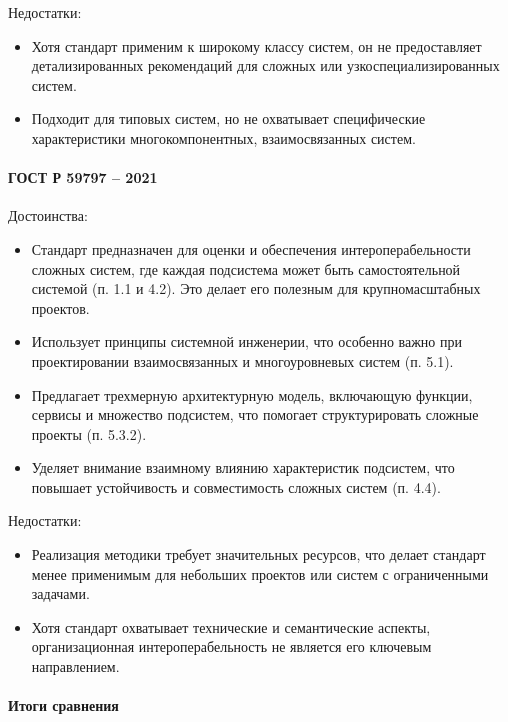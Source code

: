 Недостатки:

\begin{itemize}
	\item Хотя стандарт применим к широкому классу систем,
		он не предоставляет детализированных рекомендаций
		для сложных или узкоспециализированных систем.
	\item Подходит для типовых систем,
		но не охватывает специфические характеристики многокомпонентных,
		взаимосвязанных систем.
\end{itemize}

\paragraph{ГОСТ Р 59797 -- 2021}

Достоинства:

\begin{itemize}
	\item Стандарт предназначен для оценки
		и обеспечения интероперабельности сложных систем,
		где каждая подсистема может
		быть самостоятельной системой (п. 1.1 и 4.2).
		Это делает его полезным для крупномасштабных проектов.
	\item Использует принципы системной инженерии,
		что особенно важно при проектировании взаимосвязанных
		и многоуровневых систем (п. 5.1).
	\item Предлагает трехмерную архитектурную модель,
		включающую функции, сервисы и множество подсистем,
		что помогает структурировать сложные проекты (п. 5.3.2).
	\item Уделяет внимание взаимному влиянию характеристик подсистем,
		что повышает устойчивость и совместимость сложных систем (п. 4.4).
\end{itemize}

Недостатки:

\begin{itemize}
	\item Реализация методики требует значительных ресурсов,
		что делает стандарт менее применимым для небольших проектов
		или систем с ограниченными задачами.
	\item Хотя стандарт охватывает технические и семантические аспекты,
		организационная интероперабельность
		не является его ключевым направлением.
\end{itemize}

\paragraph{Итоги сравнения}

